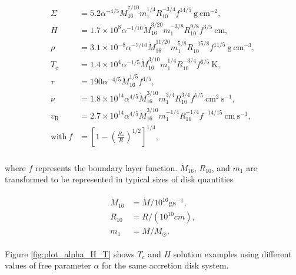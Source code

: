     \begin{align}
    \begin{split}
    \Sigma &= 5.2 \alpha^{-4/5} \dot{M}^{7/10}_{16} m^{1/4}_1 R^{-3/4}_{10} f^{14/5}\ \mathrm{g\ cm^{-2}}, \\
    H &= 1.7 \times 10^8 \alpha^{-1/10} \dot{M}^{3/20}_{16} m^{-3/8}_1 R^{9/8}_{10} f^{3/5}\ \mathrm{cm}, \\
    \rho &= 3.1 \times 10^{-8} \alpha^{-7/10} \dot{M}^{11/20}_{16} m^{5/8}_1 R^{-15/8}_{10} f^{11/5}\ \mathrm{g\ cm^{-3}}, \\
    T_{\mathrm{c}} &= 1.4 \times 10^4 \alpha^{-1/5} \dot{M}^{3/10}_{16} m^{1/4}_1 R^{-3/4}_{10} f^{6/5}\ \mathrm{K}, \\
    \tau &= 190 \alpha^{-4/5} \dot{M}^{1/5}_{16} f^{4/5}, \\
    \nu	&= 1.8 \times 10^{14} \alpha^{4/5} \dot{M}^{3/10}_{16} m^{3/4}_1 R^{3/4}_{10} f^{6/5}\ \mathrm{cm^2\ s^{-1}},  \\
    v_{\mathrm{R}}	&= 2.7 \times 10^{14} \alpha^{4/5} \dot{M}^{3/10}_{16} m^{-1/4}_1 R^{-1/4}_{10} f^{-14/15}\ \mathrm{cm\ s^{-1}},  \\
    \mathrm{with}\ f &= \left[ 1 - \left( \frac{R_*}{R} \right)^{1/2} \right]^{1/4}, \\
    \end{split}
    \label{eq:alpha_model_solution}
    \end{align}

    where $f$ represents the boundary layer function. $\dot{M}_{16}$, $R_{10}$, and $m_1$ are transformed to be represented in typical sizes of disk quantities

    \begin{align}
    \begin{split}
        \dot{M}_{16} &= \dot{M} / 10^{16} \si{\gram \second^{-1}}, \\
        R_{10} &= R / (10^{10} \si{cm}), \\
        m_1 &= M / M_{\odot}.
    \end{split} 
    \end{align}

    Figure \ref{fig:plot_alpha_H_T} shows $T_{\mathrm{c}}$ and $H$ solution examples using different values of free parameter $\alpha$ for the same accretion disk system.

